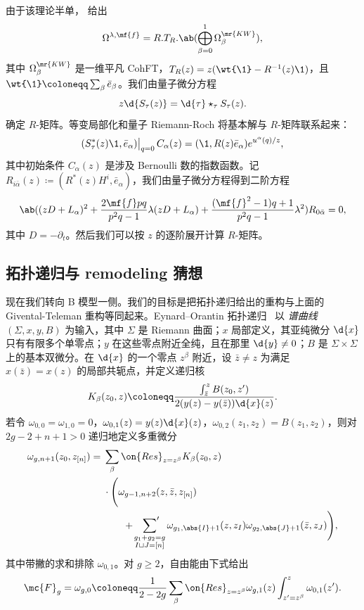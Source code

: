 由于该理论半单， 给出
\[ \Omega^{\lambda,\mf{f}} = R.T_R.\ab(\bigoplus_{\beta=0}^1 \Omega^{\mr{KW}}_{\beta}), \]
其中 \(\Omega^{\mr{KW}}_{\beta}\) 是一维平凡 CohFT，\(T_R(z) = z(\wt{\1}-R^{-1}(z)\1)\)，且 \(\wt{\1} \coloneqq \sum_{\beta}\bar{e}_{\beta}\)。我们由量子微分方程
\[ z \d{S_{\tau}(z)} = \d{\tau} \star_{\tau} S_{\tau}(z). \]
确定 \(R\)-矩阵。等变局部化和量子 Riemann-Roch 将基本解与 \(R\)-矩阵联系起来：
\[ (S^*_{\tau}(z)\1, \bar{e}_{\alpha})\big|_{q=0}\, C_{\alpha}(z) = (\1, R(z)\bar{e}_{\alpha})e^{u^{\alpha}(q)/z}, \]
其中初始条件 \(C_{\alpha}(z)\) 是涉及 Bernoulli 数的指数函数。记 \(R_{i\bar{\alpha}}(z) \coloneqq (R^*(z)H^i, \bar{e}_{\alpha})\)，我们由量子微分方程得到二阶方程
\[ \ab( (zD+L_{\alpha})^2 + \frac{2\mf{f}pq}{p^2q-1}\lambda(zD+L_{\alpha}) + \frac{(\mf{f}^2-1)q+1}{p^2q-1}\lambda^2 )R_{0\bar{\alpha}} = 0, \]
其中 \(D = -\partial_t\)。然后我们可以按 \(z\) 的逐阶展开计算 \(R\)-矩阵。

\subsection{拓扑递归与 remodeling 猜想}%
\label{sub:Topological recursion and the remodeling conjecture}

现在我们转向 B 模型一侧。我们的目标是把拓扑递归给出的重构与上面的 Givental-Teleman 重构等同起来。Eynard--Orantin 拓扑递归~\cite{EO2007} 以 \textit{谱曲线} \((\Sigma,x,y,B)\) 为输入，其中 \(\Sigma\) 是 Riemann 曲面；\(x\) 局部定义，其亚纯微分 \(\d{x}\) 只有有限多个单零点；\(y\) 在这些零点附近全纯，且在那里 \(\d{y} \neq 0\)；\(B\) 是 \(\Sigma \times \Sigma\) 上的基本双微分。在 \(\d{x}\) 的一个零点 \(z^{\beta}\) 附近，设 \(\bar{z} \neq z\) 为满足 \(x(\bar{z}) = x(z)\) 的局部共轭点，并定义递归核
\[ K_{\beta}(z_0,z) \coloneqq \frac{\int_{\bar{z}}^z B(z_0,z')}{2(y(z)-y(\bar{z}))\d{x}(z)}. \]
若令 \(\omega_{0,0} = \omega_{1,0} = 0\)，\(\omega_{0,1}(z) = y(z)\d{x}(z)\)，\(\omega_{0,2}(z_1,z_2) = B(z_1,z_2)\)，则对 \(2g-2+n+1 > 0\) 递归地定义多重微分
\begin{align*}
    \omega_{g,n+1}(z_0,z_{[n]}) ={}& \sum_{\beta}\on{Res}_{z = z^{\beta}} K_{\beta}(z_0,z) \\
    &\cdot \Bigg( \omega_{g-1,n+2}(z,\bar{z},z_{[n]}) \\
    &\qquad + \sideset{}{'}\sum_{\substack{g_1+g_2 = g \\ I \sqcup J = [n]}}\omega_{g_1,\abs{I}+1}(z,z_I)\omega_{g_2,\abs{J}+1}(\bar{z},z_J)\Bigg),
\end{align*}
其中带撇的求和排除 \(\omega_{0,1}\)。对 \(g \geq 2\)，自由能由下式给出
\[ \mc{F}_g = \omega_{g,0} \coloneqq \frac{1}{2-2g}\sum_{\beta}\on{Res}_{z=z^{\beta}}\omega_{g,1}(z)\int_{z'=z^{\beta}}^z \omega_{0,1}(z'). \]

